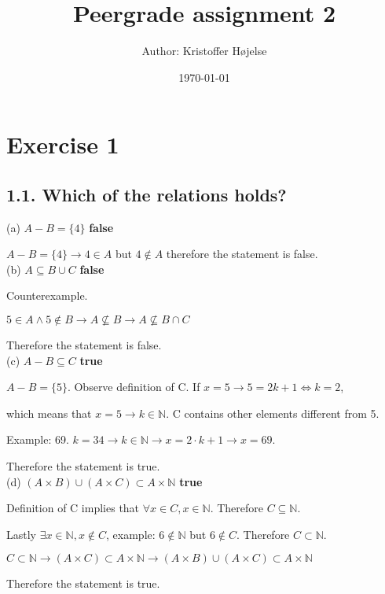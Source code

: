 \documentclass[a4paper,11pt]{article}
\title{Peergrade assignment 2}
\author{Author: Kristoffer Højelse}
\date{\today}
\begin{document}
 

\maketitle

\section*{Exercise 1}

\subsection*{1.1. Which of the relations holds?}

\noindent (a) $A - B = \{4\}$ \textbf{false}

$A-B = \{4\} \to 4 \in A$ but $4 \notin A$ therefore the statement is false.\\

\noindent (b) $A \subseteq B \cup C$ \textbf{false}

Counterexample.

$5 \in A \land 5 \notin B \to A \nsubseteq B \to A \nsubseteq B \cap C$

Therefore the statement is false.\\

\noindent (c) $A - B \subseteq C$ \textbf{true}

$A-B = \{5\}$. Observe definition of C. If $x=5 \to 5 = 2k + 1 \iff k = 2$,

which means that $x=5 \to k \in \mathbb{N}$. C contains other elements different from 5.

Example: 69. $k=34 \to k \in \mathbb{N} \to x=2 \cdot k + 1 \to x = 69$.

Therefore the statement is true.\\

\noindent (d) $(A \times B) \cup (A \times C) \subset A \times \mathbb{N}$ \textbf{true}

Definition of C implies that $\forall x \in C, x \in \mathbb{N}$. Therefore $C \subseteq \mathbb{N}$.

Lastly $\exists x \in \mathbb{N}, x \notin C$, example: $6 \notin \mathbb{N}$ but $6 \notin C$. Therefore $C \subset \mathbb{N}$.

$C \subset \mathbb{N} \to (A \times C) \subset A \times \mathbb{N} \to (A \times B) \cup (A \times C) \subset A \times \mathbb{N}$

Therefore the statement is true.
\end{document}
